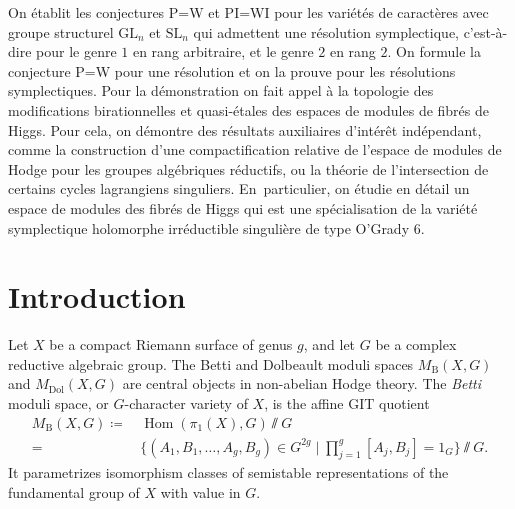 \documentclass[JEP,XML,SOM,Unicode, NoEqCountersInSection,NoFloatCountersInSection,published]{cedram}
\let\ts\textstyle
\theoremstyle{definition}
\newcommand{\Hom}{\operatorname{Hom}}
\newcommand{\MDolG}{{M}_{\mathrm{Dol}}(X,G)}
\newcommand{\MBG}{{M}_{\mathrm{B}}(X,G)}
\begin{document}
\begin{altabstract}
On établit les conjectures P=W et PI=WI pour les variétés de caractères avec groupe structurel $\mathrm {GL}_n$ et $\mathrm {SL}_n$ qui admettent une résolution symplectique, c'est-à-dire pour le genre $1$ en rang arbitraire, et le genre $2$ en rang $2$. On formule la conjecture P=W pour une résolution et on la prouve pour les résolutions symplectiques. Pour la démonstration on fait appel à la topologie des modifications birationnelles et quasi-étales des espaces de modules de fibrés de Higgs. Pour cela, on démontre des résultats auxiliaires d'intérêt indépendant, comme la construction d'une compactification relative de l'espace de modules de Hodge pour les groupes algébriques réductifs, ou la théorie de l'intersection de certains cycles lagrangiens singuliers. En~particulier, on étudie en détail un espace de modules des fibrés de Higgs qui est une spécialisation de la variété symplectique holomorphe irréductible singulière de type O'Grady $6$.
\end{altabstract}

\maketitle

\tableofcontents
\mainmatter

\section{Introduction}

Let $X$ be a compact Riemann surface of genus $g$, and let $G$ be a complex reductive algebraic group. The Betti and Dolbeault moduli spaces $\MBG$ and $\MDolG$ are central objects in non-abelian Hodge theory. The \emph{Betti} moduli space, or $G$\nobreakdash-char\-acter variety of $X$, is the affine GIT quotient
\begin{equation}
\begin{aligned}\label{eq:charactervar} \MBG \coloneqq&\,\Hom(\pi_1(X), G)\sslash G \\
=&\,\big\{ (A_1, B_1, \ldots, A_{g}, B_{g}) \in G^{2g} \mid \ts\prod^{g}_{j=1}[A_j, B_j]=1_{G} \big\}\sslash G.
\end{aligned}
\end{equation}
It parametrizes isomorphism classes of semistable representations of the fundamental group of $X$ with value in $G$.
\end{document}
